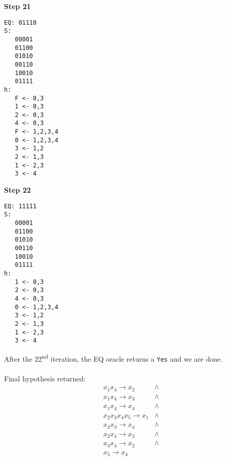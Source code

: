 \documentclass{article}
\begin{document}
\begin{center}
\begin{minipage}[t]{0.19\textwidth}
\textbf{Step 21}
\begin{lstlisting}
EQ: 01110
S: 
   00001
   01100
   01010
   00110
   10010
   01111
h: 
   F <- 0,3
   1 <- 0,3
   2 <- 0,3
   4 <- 0,3
   F <- 1,2,3,4
   0 <- 1,2,3,4
   3 <- 1,2
   2 <- 1,3
   1 <- 2,3
   3 <- 4
\end{lstlisting}   
\end{minipage}
\begin{minipage}[t]{0.19\textwidth}
\textbf{Step 22}
\begin{lstlisting}
EQ: 11111
S: 
   00001
   01100
   01010
   00110
   10010
   01111
h: 
   1 <- 0,3
   2 <- 0,3
   4 <- 0,3
   0 <- 1,2,3,4
   3 <- 1,2
   2 <- 1,3
   1 <- 2,3
   3 <- 4
\end{lstlisting}   
\end{minipage}
\begin{minipage}[t]{0.57\textwidth}
\normalsize
After the 22\textsuperscript{nd} iteration, the EQ oracle returns
a \texttt{Yes} and we are done.
\\
\\
Final hypothesis returned:
\begin{eqnarray*}
  x_1x_4 \rightarrow x_2 & \wedge    \\
  x_1x_4 \rightarrow x_3 & \wedge \\
  x_1x_4 \rightarrow x_4 & \wedge \\
  x_2x_3x_4x_5 \rightarrow x_1 & \wedge \\
  x_2x_3 \rightarrow x_4 & \wedge \\
  x_2x_4 \rightarrow x_3 & \wedge \\
  x_3x_4 \rightarrow x_2 & \wedge \\
  x_5 \rightarrow x_4 & \\
\end{eqnarray*}

\end{minipage}
\end{center}
\end{document}
